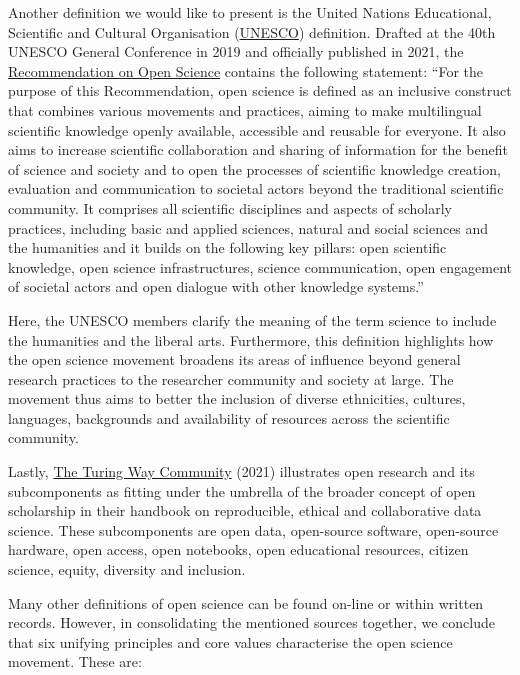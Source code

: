 \documentclass[
]{book}
\begin{document}
Another definition we would like to present is the United Nations Educational, Scientific and Cultural Organisation (\href{https://www.unesco.org/en}{UNESCO}) definition. Drafted at the 40th UNESCO General Conference in 2019 and officially published in 2021, the \href{https://en.unesco.org/science-sustainable-future/open-science/recommendation}{Recommendation on Open Science} contains the following statement: ``For the purpose of this Recommendation, open science is defined as an inclusive construct that combines various movements and practices, aiming to make multilingual scientific knowledge openly available, accessible and reusable for everyone. It also aims to increase scientific collaboration and sharing of information for the benefit of science and society and to open the processes of scientific knowledge creation, evaluation and communication to societal actors beyond the traditional scientific community. It comprises all scientific disciplines and aspects of scholarly practices, including basic and applied sciences, natural and social sciences and the humanities and it builds on the following key pillars: open scientific knowledge, open science infrastructures, science communication, open engagement of societal actors and open dialogue with other knowledge systems.''

Here, the UNESCO members clarify the meaning of the term science to include the humanities and the liberal arts. Furthermore, this definition highlights how the open science movement broadens its areas of influence beyond general research practices to the researcher community and society at large. The movement thus aims to better the inclusion of diverse ethnicities, cultures, languages, backgrounds and availability of resources across the scientific community.

Lastly, \href{https://the-turing-way.netlify.app/welcome}{The Turing Way Community} (2021) illustrates open research and its subcomponents as fitting under the umbrella of the broader concept of open scholarship in their handbook on reproducible, ethical and collaborative data science. These subcomponents are open data, open-source software, open-source hardware, open access, open notebooks, open educational resources, citizen science, equity, diversity and inclusion.

Many other definitions of open science can be found on-line or within written records. However, in consolidating the mentioned sources together, we conclude that six unifying principles and core values characterise the open science movement. These are:
\end{document}
